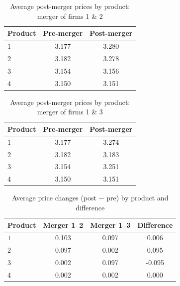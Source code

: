 \begin{table}[H]
\centering
\caption{Average post-merger prices by product: merger of firms 1 \& 2}
\begin{tabular}{lcc}
\hline Product & Pre-merger & Post-merger \\ \hline
$1$ & 3.177 & 3.280 \\
$2$ & 3.182 & 3.278 \\
$3$ & 3.154 & 3.156 \\
$4$ & 3.150 & 3.151 \\
\hline\end{tabular}\end{table}

\begin{table}[H]
\centering
\caption{Average post-merger prices by product: merger of firms 1 \& 3}
\begin{tabular}{lcc}
\hline Product & Pre-merger & Post-merger \\ \hline
$1$ & 3.177 & 3.274 \\
$2$ & 3.182 & 3.183 \\
$3$ & 3.154 & 3.251 \\
$4$ & 3.150 & 3.151 \\
\hline\end{tabular}\end{table}

\begin{table}[H]
\centering
\caption{Average price changes (post $-$ pre) by product and difference}
\begin{tabular}{lccc}
\hline Product & Merger 1--2 & Merger 1--3 & Difference \\ \hline
$1$ & 0.103 & 0.097 & 0.006 \\
$2$ & 0.097 & 0.002 & 0.095 \\
$3$ & 0.002 & 0.097 & -0.095 \\
$4$ & 0.002 & 0.002 & 0.000 \\
\hline\end{tabular}\end{table}
